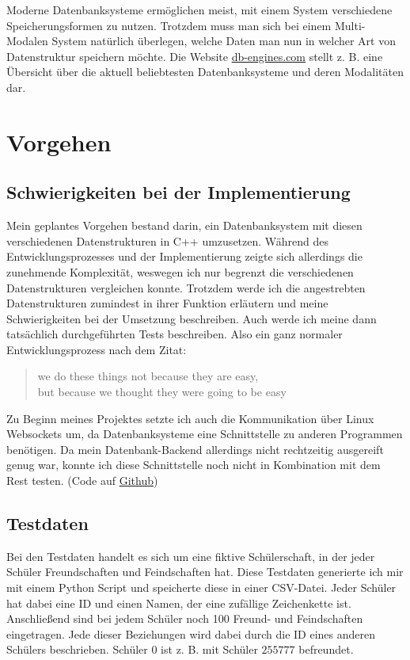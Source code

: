 \documentclass[11pt,a4paper]{article}
\begin{document}
Moderne Datenbanksysteme ermöglichen meist, mit einem System verschiedene
Speicherungsformen zu nutzen. Trotzdem muss man sich bei einem Multi-Modalen System
natürlich überlegen, welche Daten man nun in welcher Art von Datenstruktur speichern
möchte. Die Website \href{https://db-engines.com/en/ranking}{db-engines.com} stellt z. B.
eine Übersicht über die aktuell beliebtesten Datenbanksysteme und deren Modalitäten dar.

\section{Vorgehen}

\subsection{Schwierigkeiten bei der Implementierung}

Mein geplantes Vorgehen bestand darin, ein Datenbanksystem mit diesen
verschiedenen Datenstrukturen in C++ umzusetzen.
Während des Entwicklungsprozesses und der Implementierung zeigte sich allerdings die
zunehmende Komplexität, weswegen ich nur begrenzt die verschiedenen Datenstrukturen
vergleichen konnte. Trotzdem werde ich die angestrebten Datenstrukturen
zumindest in ihrer Funktion erläutern und meine Schwierigkeiten bei der Umsetzung
beschreiben.
Auch werde ich meine dann tatsächlich durchgeführten Tests beschreiben.
Also ein ganz normaler Entwicklungsprozess nach dem Zitat:

\begin{quote}
    \guillemetright we do these things not because they are easy, \\
    \hspace*{0.2em} but because we thought they were going to be easy\guillemetleft
\end{quote}

Zu Beginn meines Projektes setzte ich auch
die Kommunikation über Linux Websockets um, da Datenbanksysteme
eine Schnittstelle zu anderen Programmen benötigen.
Da mein Datenbank-Backend allerdings nicht rechtzeitig ausgereift genug war, konnte
ich diese Schnittstelle noch nicht in Kombination mit dem Rest testen.
(Code auf \href{https://github.com/Redstonerayy/light-db}{Github})

\subsection{Testdaten}

Bei den Testdaten handelt es sich um eine fiktive Schülerschaft, in der jeder
Schüler Freundschaften und Feindschaften hat. Diese Testdaten generierte ich mir
mit einem Python Script und speicherte diese in einer CSV-Datei.
Jeder Schüler hat dabei eine ID und einen Namen, der eine zufällige Zeichenkette ist.
Anschließend sind bei jedem Schüler noch 100 Freund- und Feindschaften eingetragen.
Jede dieser Beziehungen wird dabei durch die ID eines anderen Schülers beschrieben.
Schüler $0$ ist z. B. mit Schüler $255777$ befreundet.
\end{document}

